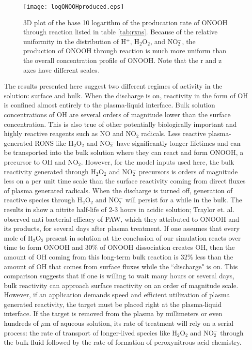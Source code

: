 \begin{figure}[htb]
    \centering
    \texttt{[image: logONOOHproduced.eps]}
    \caption{3D plot of the base 10 logarithm of the producation rate of ONOOH through reaction \ONOOHlong{} listed in table \ref{tab:rxns}. Because of the relative uniformity in the distribution of H$^+$, H$_2$O$_2$, and NO$_2^-$, the production of ONOOH through reaction \ONOOHlong{} is much more uniform than the overall concentration profile of ONOOH. Note that the r and z axes have different scales.}
    \label{fig:log_ONOOH_prod_rate}
\end{figure}

The results presented here suggest two different regimes of activity in the solution: surface and bulk. When the discharge is on, reactivity in the form of OH is confined almost entirely to the plasma-liquid interface. Bulk solution concentrations of OH are several orders of magnitude lower than the surface concentration. This is also true of other potentially biologically important and highly reactive reagents such as NO and NO$_2$ radicals. Less reactive plasma-generated RONS like H$_2$O$_2$ and NO$_2^-$ have significantly longer lifetimes and can be transported into the bulk solution where they can react and form ONOOH, a precursor to OH and NO$_2$. However, for the model inputs used here, the bulk reactivity generated through H$_2$O$_2$ and NO$_2^-$ precursors is orders of magnitude less on a per unit time scale than the surface reactivity coming from direct fluxes of plasma generated radicals. When the discharge is turned off, generation of reactive species through H$_2$O$_2$ and NO$_2^-$ will persist for a while in the bulk. The results in \cite{Lukes2014b} show a nitrite half-life of 2-3 hours in acidic solution; Traylor et. al. \cite{Traylor2011h} observed anti-bacterial efficacy of PAW, which they attributed to ONOOH and its products, for several days after plasma treatment. If one assumes that every mole of H$_2$O$_2$ present in solution at the conclusion of our simulation reacts over time to form ONOOH and 30\% of ONOOH dissociation creates OH, then the amount of OH coming from this long-term bulk reaction is 32\% less than the amount of OH that comes from surface fluxes while the ``discharge" is on. This comparison suggests that if one is willing to wait many hours or several days, bulk reactivity can approach surface reactivity on an order of magnitude scale. However, if an application demands speed and efficient utilization of plasma generated reactivity, the target must be placed right at the plasma-liquid interface. If the target is removed from the plasma by millimeters or even hundreds of $\mu$m of aqueous solution, its rate of treatment will rely on a serial process: the rate of transport of longer-lived species like H$_2$O$_2$ and NO$_2^-$ through the bulk fluid followed by the rate of formation of peroxynitrous acid chemistry.

